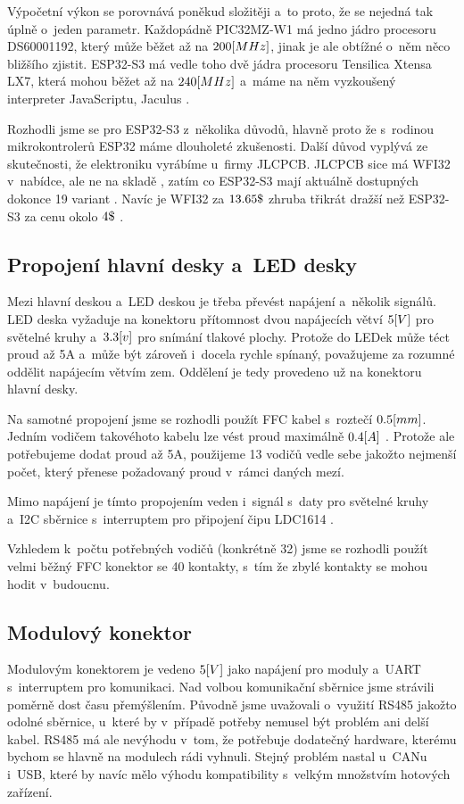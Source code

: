 Výpočetní výkon se porovnává poněkud složitěji a~to proto, že se nejedná tak úplně o~jeden parametr.
Každopádně PIC32MZ-W1 má jedno jádro procesoru DS60001192, který může běžet až na \(200\-[MHz]\)\cite{PIC32MZ}, jinak je ale obtížné o~něm něco bližšího zjistit.
ESP32-S3 má vedle toho dvě jádra procesoru Tensilica Xtensa LX7, která mohou běžet až na \(240\-[MHz]\) \cite{ESP32S3} a~máme na něm vyzkoušený interpreter JavaScriptu, Jaculus \cite{Jaculus}.

Rozhodli jsme se pro ESP32-S3 z~několika důvodů, hlavně proto že s~rodinou mikrokontrolerů ESP32 máme dlouholeté zkušenosti.
Další důvod vyplývá ze skutečnosti, že elektroniku vyrábíme u~firmy JLCPCB.
JLCPCB sice má WFI32 v~nabídce, ale ne na skladě \cite{JSC-WFI32}, zatím co ESP32-S3 mají aktuálně dostupných dokonce 19 variant \cite{JSC-ESP32-S3}.
Navíc je WFI32 za \(13.65\-\$\) zhruba třikrát dražší než ESP32-S3 za cenu okolo \(4\-\$\) \cite{JSC-WFI32}\cite{JSC-ESP32-S3}.

\subsection{Propojení hlavní desky a~LED desky}
Mezi hlavní deskou a~LED deskou je třeba převést napájení a~několik signálů.
LED deska vyžaduje na konektoru přítomnost dvou napájecích větví \(5\-[V]\) pro světelné kruhy a~\(3.3\-[v]\) pro snímání tlakové plochy.
Protože do LEDek může téct proud až 5A a~může být zároveň i~docela rychle spínaný, považujeme za rozumné oddělit napájecím větvím zem.
Oddělení je tedy provedeno už na konektoru hlavní desky.

Na samotné propojení jsme se rozhodli použít FFC kabel s~roztečí \(0.5\-[mm]\).
Jedním vodičem takovéhoto kabelu lze vést proud maximálně \(0.4\-[A]\) \cite{FFC-konektor}.
Protože ale potřebujeme dodat proud až 5A, použijeme 13 vodičů vedle sebe jakožto nejmenší počet, který přenese požadovaný proud v~rámci daných mezí.

Mimo napájení je tímto propojením veden i~signál s~daty pro světelné kruhy a~I2C sběrnice s~interruptem pro připojení čipu LDC1614 \cite{LDC1614}.

Vzhledem k~počtu potřebných vodičů (konkrétně 32) jsme se rozhodli použít velmi běžný FFC konektor se 40 kontakty, s~tím že zbylé kontakty se mohou hodit v~budoucnu.

\subsection{Modulový konektor}
Modulovým konektorem je vedeno \(5\-[V]\) jako napájení pro moduly a~UART s~interruptem pro komunikaci.
Nad volbou komunikační sběrnice jsme strávili poměrně dost času přemýšlením.
Původně jsme uvažovali o~využití RS485 jakožto odolné sběrnice, u~které by v~případě potřeby nemusel být problém ani delší kabel.
RS485 má ale nevýhodu v~tom, že potřebuje dodatečný hardware, kterému bychom se hlavně na modulech rádi vyhnuli.
Stejný problém nastal u~CANu i~USB, které by navíc mělo výhodu kompatibility s~velkým množstvím hotových zařízení.

